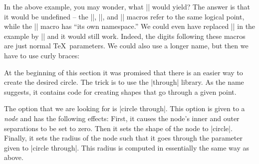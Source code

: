 \begin{codeexample}[]
\end{codeexample}
In the above example, you may wonder, what || would yield? The
answer is that it would be undefined -- the |\p|, |\x|, and |\y|
macros refer to the same logical point, while the |\n| macro has ``its
own namespace.'' We could even have replaced || in the example by
|| and it would still work. Indeed, the digits following these
macros are just normal \TeX\ parameters. We could also use a longer
name, but then we have to use curly braces:
\begin{codeexample}[]
\end{codeexample}

At the beginning of this section it was promised that there is an
easier way to create the desired circle. The trick is to use the
|through| library. As the name suggests, it contains code for creating
shapes that go through a given point.

The option that we are looking for is |circle through|. This option is
given to a \emph{node} and has the following effects: First, it causes
the node's inner and outer separations to be set to zero. Then it sets
the shape of the node to |circle|. Finally, it sets the radius of the
node such that it goes through the parameter given to
|circle through|. This radius is computed in essentially the same way
as above.

\begin{codeexample}[]
\end{codeexample}



